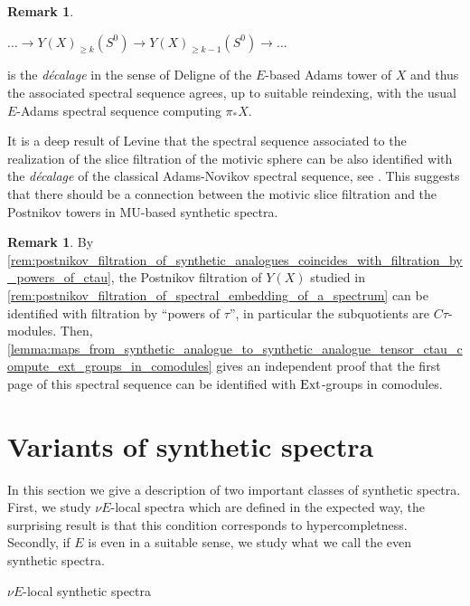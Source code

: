 \documentclass[oneside,a4paper]{amsart}
\makeatletter
\newcommand{\Ext}{\textnormal{Ext}} %
\newcommand{\MU}{\mathrm{MU}} %
\theoremstyle{plain}
\theoremstyle{definition}
\newtheorem{rem}[thm]{Remark}
\theoremstyle{remark}
\def\subsection{\@startsection{subsection}{1}%
  \z@{.7\linespacing\@plus\linespacing}{.5\linespacing}%
  {\normalfont\bfseries\centering}}%
\makeatother
\begin{document}
\begin{rem}
\begin{center}
$\ldots \rightarrow Y(X)_{\geq k}(S^{0}) \rightarrow Y(X)_{\geq k-1} (S^{0}) \rightarrow \ldots$
\end{center}
is the \emph{d\'{e}calage} in the sense of Deligne \cite{deligne1971theorie} of the $E$-based Adams tower of $X$ and thus the associated spectral sequence agrees, up to suitable reindexing, with the usual $E$-Adams spectral sequence computing $\pi_{*}X$.

It is a deep result of Levine that the spectral sequence associated to the realization of the slice filtration of the motivic sphere can be also identified with the \emph{d\'{e}calage} of the classical Adams-Novikov spectral sequence, see \cite{levine2015adams}. This suggests that there should be a connection between the motivic slice filtration and the Postnikov towers in $\MU$-based synthetic spectra. 
\end{rem}

\begin{rem}
By \cref{rem:postnikov_filtration_of_synthetic_analogues_coincides_with_filtration_by_powers_of_ctau}, the Postnikov filtration of $Y(X)$ studied in \cref{rem:postnikov_filtration_of_spectral_embedding_of_a_spectrum} can be identified with filtration by ``powers of $\tau$'', in particular the subquotients are $C\tau$-modules. Then, \cref{lemma:maps_from_synthetic_analogue_to_synthetic_analogue_tensor_ctau_compute_ext_groups_in_comodules} gives an independent proof that the first page of this spectral sequence can be identified with $\Ext$-groups in comodules. 
\end{rem}

\section{Variants of synthetic spectra}
\label{section:variants_of_synthetic_spectra}

In this section we give a description of two important classes of synthetic spectra. First, we study $\nu E$-local spectra which are defined in the expected way, the surprising result is that this condition corresponds to hypercompletness. Secondly, if $E$ is even in a suitable sense, we study what we call the even synthetic spectra. 

\subsection{$\nu E$-local synthetic spectra}
\label{subsection:nue_local_spectra}
\end{document}
